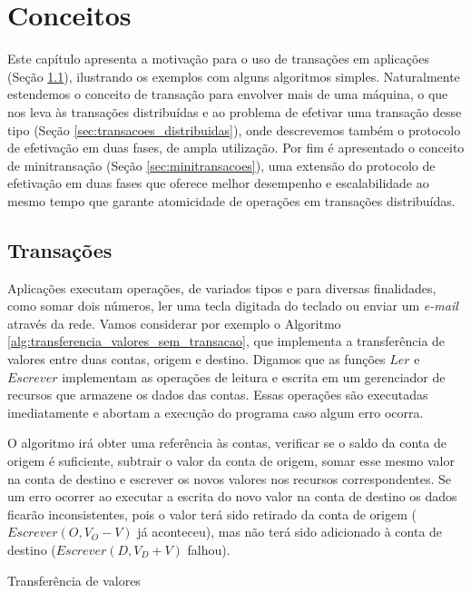 \documentclass[11pt,twoside,a4paper]{book}
\begin{document}
\chapter{Conceitos}
\label{chap:conceitos}
Este capítulo apresenta a motivação para o uso de transações em aplicações (Seção \ref{sec:transacoes}), ilustrando os exemplos com alguns algoritmos simples. Naturalmente estendemos o conceito de transação para envolver mais de uma máquina, o que nos leva às transações distribuídas e ao problema de efetivar uma transação desse tipo (Seção \ref{sec:transacoes_distribuidas}), onde descrevemos também o protocolo de efetivação em duas fases, de ampla utilização. Por fim é apresentado o conceito de minitransação (Seção \ref{sec:minitransacoes}), uma extensão do protocolo de efetivação em duas fases que oferece melhor desempenho e escalabilidade ao mesmo tempo que garante atomicidade de operações
em transações distribuídas.

\section{Transações}
\label{sec:transacoes}
Aplicações executam operações, de variados tipos e para diversas finalidades, como somar dois números, ler uma tecla digitada do teclado ou enviar um \emph{e-mail} através da rede. Vamos considerar por exemplo o Algoritmo \ref{alg:transferencia_valores_sem_transacao}, que implementa a transferência de valores entre duas contas, origem e destino. Digamos que as funções $Ler$ e $Escrever$ implementam as operações de leitura e escrita em um gerenciador de recursos que armazene os dados das contas. Essas operações são executadas imediatamente e abortam a execução do programa caso algum erro ocorra.

O algoritmo irá obter uma referência às contas, verificar se o saldo da conta de origem é suficiente, subtrair o valor da conta de origem, somar esse mesmo valor na conta de destino e escrever os novos valores nos recursos correspondentes. Se um erro ocorrer ao executar a escrita do novo valor na conta de destino os dados ficarão inconsistentes, pois o valor terá sido retirado da conta de origem ($Escrever(O, V_O - V)$ já aconteceu), mas não terá sido adicionado à conta de destino ($Escrever(D, V_D + V)$ falhou).

\begin{algorithm}
\caption{Transferência de valores}
\label{alg:transferencia_valores_sem_transacao}
\end{algorithm}
\end{document}
